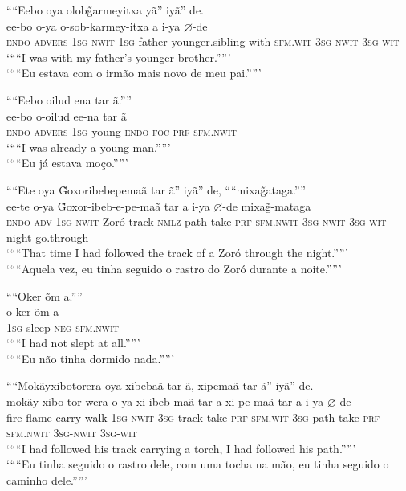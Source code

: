\documentclass[output=paper,
modfonts,nonflat
]{langsci/langscibook}
\begin{document}
\ea ““Eebo oya olob\~{g}armeyitxa yã” iyã” de.\\[.3em]
\gll ee-bo o-ya o-sob-karmey-itxa a i-ya \(\varnothing\)-de\\
\textsc{endo-advers} \textsc{1sg-nwit} \textsc{1sg}-father-younger.sibling-with \textsc{sfm.wit} \textsc{3sg-nwit} \textsc{3sg-wit}\\
\glt ‘““I was with my father’s younger brother.””’\\
\glt ‘““Eu estava com o irmão mais novo de meu pai.””’\\
\z

\ea ““Eebo oilud ena tar ã.””\\[.3em]
\gll ee-bo o-oilud ee-na tar ã\\
\textsc{endo-advers} \textsc{1sg}-young \textsc{endo-foc} \textsc{prf} \textsc{sfm.nwit}\\
\glt ‘““I was already a young man.””’{\footnotemark}\\
\glt ‘““Eu já estava moço.””’\\
\z

\ea ““Ete oya \~{G}oxoribebepemaã tar ã” iyã” de, ““mixa\~{g}ataga.””\\[.3em]
\gll ee-te o-ya \~{G}oxor-ibeb-e-pe-maã tar a i-ya \(\varnothing\)-de mixa\~{g}-mataga\\
\textsc{endo-adv} \textsc{1sg-nwit} Zoró-track-\textsc{nmlz}-path-take \textsc{prf} \textsc{sfm.nwit} \textsc{3sg-nwit} \textsc{3sg-wit} night-go.through\\
\glt ‘““That time I had followed the track of a Zoró through the night.””’\\
\glt ‘““Aquela vez, eu tinha seguido o rastro do Zoró durante a noite.””’\\
\z

\ea ““Oker õm a.””\\[.3em]
\gll o-ker õm a\\
\textsc{1sg}-sleep \textsc{neg} \textsc{sfm.nwit}\\
\glt ‘““I had not slept at all.””’\\
\glt ‘““Eu não tinha dormido nada.””’\\
\z
 
\ea ““Mokãyxibotorera oya xibebaã tar ã, xipemaã tar ã” iyã” de.\\[.3em]
\gll mokãy-xibo-tor-wera o-ya xi-ibeb-maã tar a xi-pe-maã tar a i-ya \(\varnothing\)-de\\
fire-flame-carry-walk \textsc{1sg-nwit} \textsc{3sg}-track-take \textsc{prf} \textsc{sfm.wit} \textsc{3sg}-path-take \textsc{prf} \textsc{sfm.nwit} \textsc{3sg-nwit} \textsc{3sg-wit}\\
\glt ‘““I had followed his track carrying a torch, I had followed his path.””’\\
\glt ‘““Eu tinha seguido o rastro dele, com uma tocha na mão, eu tinha seguido o caminho dele.””’\\
\z
\end{document}
